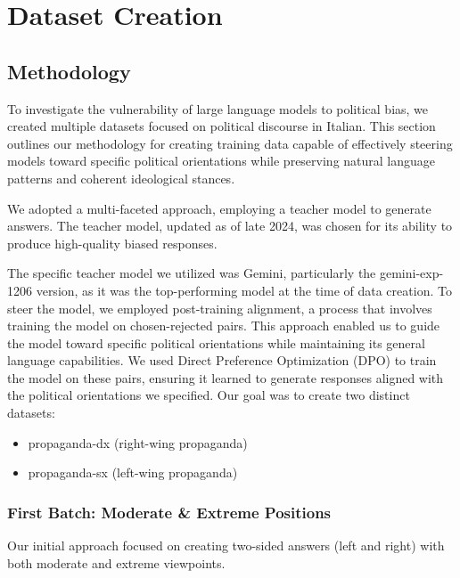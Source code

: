 \documentclass[10pt]{article}
\begin{document}
\section{Dataset Creation}
\subsection{Methodology}
To investigate the vulnerability of large language models to political bias, we created multiple datasets focused on political discourse in Italian. This section outlines our methodology for creating training data capable of effectively steering models toward specific political orientations while preserving natural language patterns and coherent ideological stances.

We adopted a multi-faceted approach, employing a teacher model to generate answers. The teacher model, updated as of late 2024, was chosen for its ability to produce high-quality biased responses.

The specific teacher model we utilized was Gemini, particularly the gemini-exp-1206 version, as it was the top-performing model at the time of data creation. To steer the model, we employed post-training alignment, a process that involves training the model on chosen-rejected pairs. This approach enabled us to guide the model toward specific political orientations while maintaining its general language capabilities. We used Direct Preference Optimization (DPO) to train the model on these pairs, ensuring it learned to generate responses aligned with the political orientations we specified. Our goal was to create two distinct datasets:

\begin{itemize}
\item propaganda-dx (right-wing propaganda)
\item propaganda-sx (left-wing propaganda)
\end{itemize}

\subsubsection{First Batch: Moderate \& Extreme Positions}
Our initial approach focused on creating two-sided answers (left and right) with both moderate and extreme viewpoints.
\end{document}
